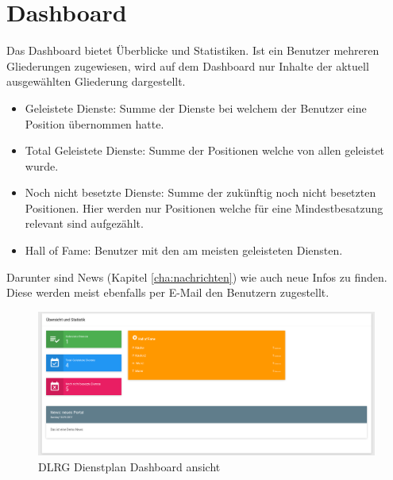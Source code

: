 \chapter{Dashboard}
\label{cha:dashboard}

Das Dashboard bietet Überblicke und Statistiken. Ist ein Benutzer mehreren Gliederungen zugewiesen, wird auf dem Dashboard nur Inhalte der aktuell ausgewählten Gliederung dargestellt.

\begin{itemize}
\item Geleistete Dienste: Summe der Dienste bei welchem der Benutzer eine Position übernommen hatte.
\item Total Geleistete Dienste: Summe der Positionen welche von allen geleistet wurde.
\item Noch nicht besetzte Dienste: Summe der zukünftig noch nicht besetzten Positionen. Hier werden nur Positionen welche für eine Mindestbesatzung relevant sind aufgezählt.
\item Hall of Fame: Benutzer mit den am meisten geleisteten Diensten. 
\end{itemize}

\noindent Darunter sind News (Kapitel \ref{cha:nachrichten}) wie auch neue Infos zu finden. Diese werden meist ebenfalls per E-Mail den Benutzern zugestellt.

\begin{figure}[h]
 \begin{addmargin}{-0.2\linewidth}
   \centering 
   \includegraphics[width=20cm]{Bilder/view_overview.png}
 \end{addmargin} 
 \caption[Dashboard ansicht]{DLRG Dienstplan Dashboard ansicht}
 \label{fig:view_overview}
\end{figure}
